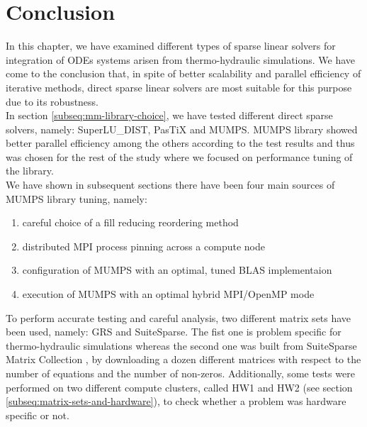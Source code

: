 \section{Conclusion}
\label{subseq:mm-conclusion}

In this chapter, we have examined different types of sparse linear solvers for integration of ODEs systems arisen from thermo-hydraulic simulations. We have come to the conclusion that, in spite of better scalability and parallel efficiency of iterative methods, direct sparse linear solvers are most suitable for this purpose due to its robustness.\\


In section \ref{subseq:mm-library-choice}, we have tested different direct sparse solvers, namely: SuperLU\_DIST, PasTiX and MUMPS. MUMPS library showed better parallel efficiency among the others according to the test results and thus was chosen for the rest of the study where we focused on performance tuning of the library.\\


We have shown in subsequent sections there have been four main sources of MUMPS library tuning, namely:

\begin{enumerate}
	\item careful choice of a fill reducing reordering method \label{conclusion:mm-1}
	\item distributed MPI process pinning across a compute node \label{conclusion:mm-2}
	\item configuration of MUMPS with an optimal, tuned BLAS implementaion \label{conclusion:mm-3}
	\item execution of MUMPS with an optimal hybrid MPI/OpenMP mode \label{conclusion:mm-4}
\end{enumerate}


To perform accurate testing and careful analysis, two different matrix sets have been used, namely: GRS and SuiteSparse. The fist one is problem specific for thermo-hydraulic simulations whereas the second one was built from SuiteSparse Matrix Collection \cite{sparse-matrix-collection:1}, \cite{sparse-matrix-collection:2} by downloading a dozen different matrices with respect to the number of equations and the number of non-zeros. Additionally, some tests were performed on two different compute clusters, called HW1 and HW2 (see section \ref{subseq:matrix-sets-and-hardware}), to check whether a problem was hardware specific or not.\\




